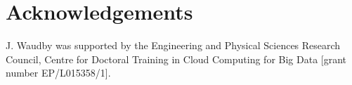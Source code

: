 \section*{Acknowledgements}

{\footnotesize
J. Waudby was supported by the Engineering and Physical Sciences Research Council, Centre for Doctoral Training in Cloud Computing for Big Data [grant number EP/L015358/1].
}
